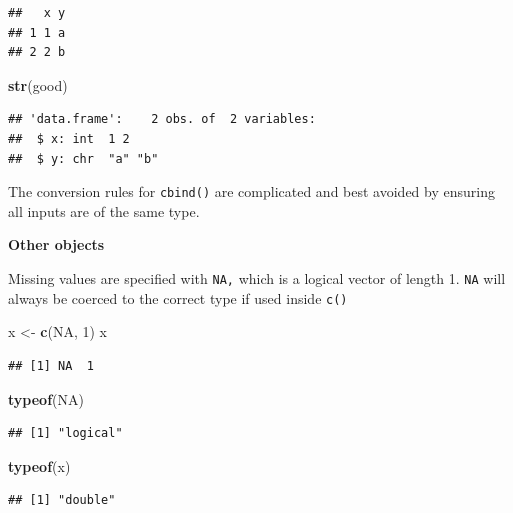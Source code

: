 \documentclass[
]{book}
\newenvironment{Shaded}{\begin{snugshade}}{\end{snugshade}}
\newcommand{\ConstantTok}[1]{\textcolor[rgb]{0.56,0.35,0.01}{#1}}
\newcommand{\DecValTok}[1]{\textcolor[rgb]{0.00,0.00,0.81}{#1}}
\newcommand{\FunctionTok}[1]{\textcolor[rgb]{0.13,0.29,0.53}{\textbf{#1}}}
\newcommand{\NormalTok}[1]{#1}
\newcommand{\OtherTok}[1]{\textcolor[rgb]{0.56,0.35,0.01}{#1}}
\begin{document}
\begin{verbatim}
##   x y
## 1 1 a
## 2 2 b
\end{verbatim}

\begin{Shaded}
\begin{Highlighting}[]
\FunctionTok{str}\NormalTok{(good)}
\end{Highlighting}
\end{Shaded}

\begin{verbatim}
## 'data.frame':    2 obs. of  2 variables:
##  $ x: int  1 2
##  $ y: chr  "a" "b"
\end{verbatim}

The conversion rules for \texttt{cbind()} are complicated and best avoided by ensuring all inputs are of the same type.

\textbf{Other objects}

Missing values are specified with \texttt{NA,} which is a logical vector of length 1. \texttt{NA} will always be coerced to the correct type if used inside \texttt{c()}

\begin{Shaded}
\begin{Highlighting}[]
\NormalTok{x }\OtherTok{\textless{}{-}} \FunctionTok{c}\NormalTok{(}\ConstantTok{NA}\NormalTok{, }\DecValTok{1}\NormalTok{)}
\NormalTok{x}
\end{Highlighting}
\end{Shaded}

\begin{verbatim}
## [1] NA  1
\end{verbatim}

\begin{Shaded}
\begin{Highlighting}[]
\FunctionTok{typeof}\NormalTok{(}\ConstantTok{NA}\NormalTok{)}
\end{Highlighting}
\end{Shaded}

\begin{verbatim}
## [1] "logical"
\end{verbatim}

\begin{Shaded}
\begin{Highlighting}[]
\FunctionTok{typeof}\NormalTok{(x)}
\end{Highlighting}
\end{Shaded}

\begin{verbatim}
## [1] "double"
\end{verbatim}
\end{document}
